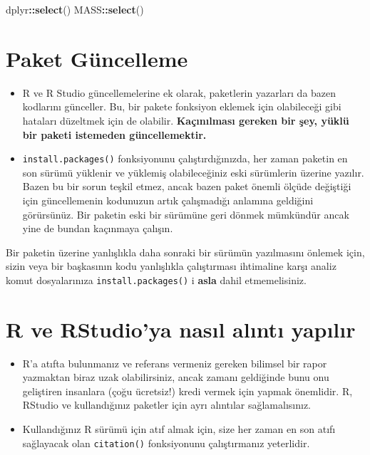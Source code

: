 \documentclass[
  oneside]{book}
\newenvironment{Shaded}{\begin{snugshade}}{\end{snugshade}}
\newcommand{\FunctionTok}[1]{\textcolor[rgb]{0.13,0.29,0.53}{\textbf{#1}}}
\newcommand{\NormalTok}[1]{#1}
\newcommand{\SpecialCharTok}[1]{\textcolor[rgb]{0.81,0.36,0.00}{\textbf{#1}}}
\begin{document}
\begin{Shaded}
\begin{Highlighting}[]
\NormalTok{dplyr}\SpecialCharTok{::}\FunctionTok{select}\NormalTok{()}
\NormalTok{MASS}\SpecialCharTok{::}\FunctionTok{select}\NormalTok{()}
\end{Highlighting}
\end{Shaded}

\hypertarget{paket-guxfcncelleme}{%
\section{Paket Güncelleme}\label{paket-guxfcncelleme}}

\begin{itemize}
\item
  R ve R Studio güncellemelerine ek olarak, paketlerin yazarları da bazen kodlarını günceller. Bu, bir pakete fonksiyon eklemek için olabileceği gibi hataları düzeltmek için de olabilir. \textbf{Kaçınılması gereken bir şey, yüklü bir paketi istemeden güncellemektir.}
\item
  \texttt{install.packages()} fonksiyonunu çalıştırdığınızda, her zaman paketin en son sürümü yüklenir ve yüklemiş olabileceğiniz eski sürümlerin üzerine yazılır. Bazen bu bir sorun teşkil etmez, ancak bazen paket önemli ölçüde değiştiği için güncellemenin kodunuzun artık çalışmadığı anlamına geldiğini görürsünüz. Bir paketin eski bir sürümüne geri dönmek mümkündür ancak yine de bundan kaçınmaya çalışın.
\end{itemize}

\begin{info}
Bir paketin üzerine yanlışlıkla daha sonraki bir sürümün yazılmasını
önlemek için, sizin veya bir başkasının kodu yanlışlıkla çalıştırması
ihtimaline karşı analiz komut dosyalarınıza \texttt{install.packages()}
i \textbf{asla} dahil etmemelisiniz.
\end{info}

\hypertarget{r-ve-rstudioya-nasux131l-alux131ntux131-yapux131lux131r}{%
\section{R ve RStudio'ya nasıl alıntı yapılır}\label{r-ve-rstudioya-nasux131l-alux131ntux131-yapux131lux131r}}

\begin{itemize}
\item
  R'a atıfta bulunmanız ve referans vermeniz gereken bilimsel bir rapor yazmaktan biraz uzak olabilirsiniz, ancak zamanı geldiğinde bunu onu geliştiren insanlara (çoğu ücretsiz!) kredi vermek için yapmak önemlidir. R, RStudio ve kullandığınız paketler için ayrı alıntılar sağlamalısınız.
\item
  Kullandığınız R sürümü için atıf almak için, size her zaman en son atıfı sağlayacak olan \texttt{citation()} fonksiyonunu çalıştırmanız yeterlidir.
\end{itemize}
\end{document}
